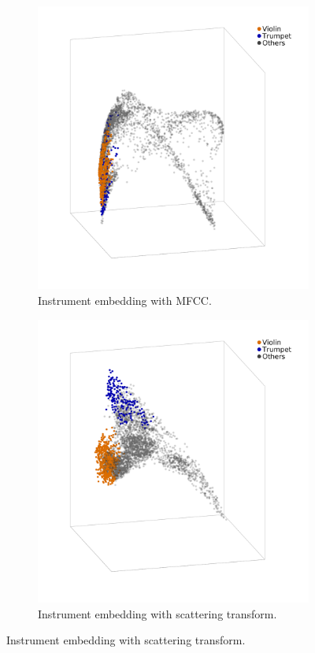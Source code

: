 \begin{figure}
        \begin{subfigure}{0.45\textwidth}
                \centering
                \includegraphics[width=\linewidth]{mf_inst_two_dmap.png}
                \caption{Instrument embedding with MFCC.}
                \label{fig:mf_inst_two_dmap}
        \end{subfigure}%
        \begin{subfigure}{0.45\textwidth}
                \centering
                \includegraphics[width=\linewidth]{sc_inst_two_dmap.png}
                \caption{Instrument embedding with scattering transform.}
                \label{fig:sc_inst_two_dmap}
        \end{subfigure}%


\end{figure}
